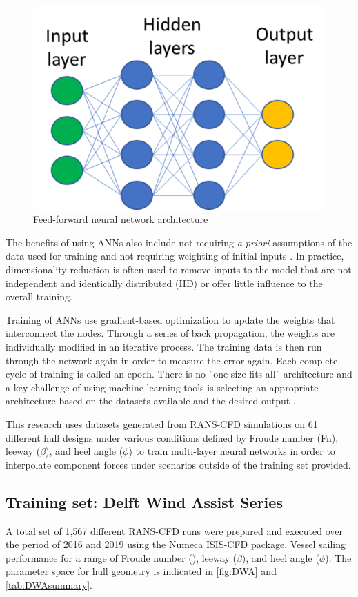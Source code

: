 \documentclass[twoside,twocolumn]{article}
\begin{document}
\begin{figure}[!ht]
\centering
\includegraphics[width=.6\columnwidth]{images/ffnn.png}  %
\caption{Feed-forward neural network architecture}
\label{fig:ffnn}
\end{figure}
%

The benefits of using ANNs also include not requiring \textit{a priori} assumptions of the data used for training and not requiring weighting of initial inputs \citep{Gardner1998}. In practice, dimensionality reduction is often used to remove inputs to the model that are not independent and identically distributed (IID) or offer little influence to the overall training. 

Training of ANNs use gradient-based optimization to update the weights that interconnect the nodes. Through a series of back propagation, the weights are individually modified in an iterative process. The training data is then run through the network again in order to measure the error again. Each complete cycle of training is called an epoch. There is no ''one-size-fits-all'' architecture and a key challenge of using machine learning tools is selecting an appropriate architecture based on the datasets available and the desired output \citep{Wolpert1997}.

This research uses datasets generated from RANS-CFD simulations on 61 different hull designs under various conditions defined by Froude number (Fn), leeway ($\beta$), and heel angle ($\phi$) to train multi-layer neural networks in order to interpolate component forces under scenarios outside of the training set provided. 


\subsection{Training set: Delft Wind Assist Series}

A total set of 1,567 different RANS-CFD runs were prepared and executed over the period of 2016 and 2019 using the Numeca ISIS-CFD package. Vessel sailing performance for a range of Froude number (\Fn), leeway ($\beta$), and heel angle ($\phi$). The parameter space for hull geometry is indicated in \cref{fig:DWA} and \cref{tab:DWAsummary}.
\end{document}
